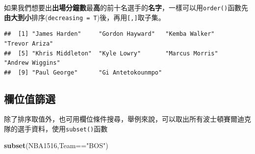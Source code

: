 \documentclass[]{book}
\newenvironment{Shaded}{\begin{snugshade}}{\end{snugshade}}
\newcommand{\KeywordTok}[1]{\textcolor[rgb]{0.13,0.29,0.53}{\textbf{{#1}}}}
\newcommand{\DataTypeTok}[1]{\textcolor[rgb]{0.13,0.29,0.53}{{#1}}}
\newcommand{\DecValTok}[1]{\textcolor[rgb]{0.00,0.00,0.81}{{#1}}}
\newcommand{\StringTok}[1]{\textcolor[rgb]{0.31,0.60,0.02}{{#1}}}
\newcommand{\NormalTok}[1]{{#1}}
\theoremstyle{definition}
\theoremstyle{definition}
\theoremstyle{remark}
\begin{document}
如果我們想要出\textbf{出場分鐘數}最\textbf{高}的前十名選手的\textbf{名字}，一樣可以用\texttt{order()}函數先\textbf{由大到小}排序(\texttt{decreasing\ =\ T})後，再用\texttt{{[},{]}}取子集。

\begin{Shaded}
\end{Shaded}

\begin{verbatim}
##  [1] "James Harden"     "Gordon Hayward"   "Kemba Walker"     "Trevor Ariza"    
##  [5] "Khris Middleton"  "Kyle Lowry"       "Marcus Morris"    "Andrew Wiggins"  
##  [9] "Paul George"      "Gi Antetokounmpo"
\end{verbatim}

\subsection{欄位值篩選}

除了排序取值外，也可用欄位條件搜尋，舉例來說，可以取出所有波士頓賽爾迪克隊的選手資料，使用\texttt{subset()}函數

\begin{Shaded}
\begin{Highlighting}[]
\KeywordTok{subset}\NormalTok{(NBA1516,Team==}\StringTok{"BOS"}\NormalTok{)}
\end{Highlighting}
\end{Shaded}
\end{document}
